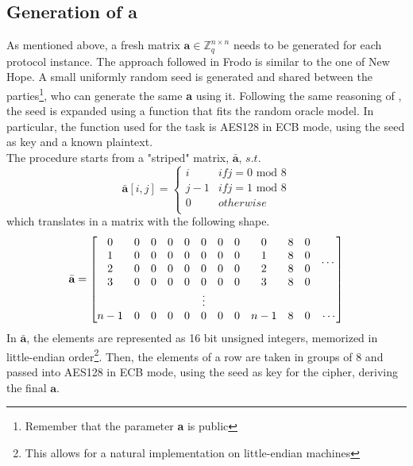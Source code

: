 \subsection{Generation of \textbf{a}}\label{sec:fr:a_generation}
As mentioned above, a fresh matrix $\textbf{a} \in \mathbb{Z}^{n\times n}_q$ needs to be generated for each protocol instance. The approach followed in Frodo is similar to the one of New Hope. A small uniformly random seed is generated and shared between the parties\footnote{Remember that the parameter \textbf{a} is public}, who can generate the same \textbf{a} using it. Following the same reasoning of \cite{newhope}, the seed is expanded using a function that fits the random oracle model. In particular, the function used for the task is AES128 in ECB mode, using the seed as key and a known plaintext.\\
The procedure starts from a "striped" matrix, $\bar{\textbf{a}}$, $s.t.$ 
\begin{equation*}
\bar{\textbf{a}}[i,j]=
\begin{cases}
i   & if j=0\text{ mod }8    \\
j-1 & if j=1\text{ mod }8    \\
0   & otherwise              \\
\end{cases}
\end{equation*}
which translates in a matrix with the following shape.
\begin{equation*}
\bar{\textbf{a}}=
\setcounter{MaxMatrixCols}{12}
\begin{bmatrix}
0  & 0 & 0 & 0 & 0 & 0 & 0 & 0 & 0 & 8 & 0 & \multirow{4}{*}{$\cdots$}     \\
1  & 0 & 0 & 0 & 0 & 0 & 0 & 0 & 1 & 8 & 0 & \\
2  & 0 & 0 & 0 & 0 & 0 & 0 & 0 & 2 & 8 & 0 & \\
3  & 0 & 0 & 0 & 0 & 0 & 0 & 0 & 3 & 8 & 0 & \\
\multicolumn{11}{c}{\vdots}              & \\
n-1& 0 & 0 & 0 & 0 & 0 & 0 & 0 &n-1& 8 & 0 & \cdots \\
\end{bmatrix}
\end{equation*}
In $\bar{\textbf{a}}$, the elements are represented as 16 bit unsigned integers, memorized in little-endian order\footnote{This allows for a natural implementation on little-endian machines}. Then, the elements of a row are taken in groups of 8 and passed into AES128 in ECB mode, using the seed as key for the cipher, deriving the final $\textbf{a}$.
